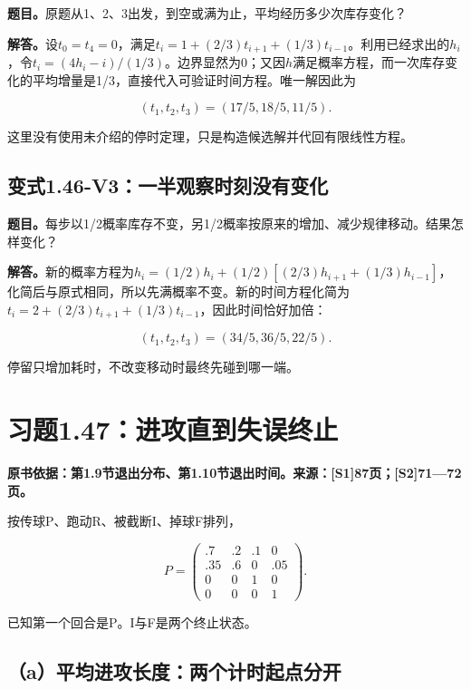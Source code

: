 \documentclass[
  11pt,
  a4paper,
  UTF8,
  fontset=fandol]{ctexart}
\begin{document}
\textbf{题目。}原题从1、2、3出发，到空或满为止，平均经历多少次库存变化？

\textbf{解答。}设\(t_0=t_4=0\)，满足\(t_i=1+(2/3)t_{i+1}+(1/3)t_{i-1}\)。利用已经求出的\(h_i\)，令\(t_i=(4h_i-i)/(1/3)\)。边界显然为0；又因\(h\)满足概率方程，而一次库存变化的平均增量是1/3，直接代入可验证时间方程。唯一解因此为

\[
\boxed{(t_1,t_2,t_3)=(17/5,18/5,11/5).}
\]

这里没有使用未介绍的停时定理，只是构造候选解并代回有限线性方程。

\subsection{变式1.46-V3：一半观察时刻没有变化}\label{ux53d8ux5f0f1.46-v3ux4e00ux534aux89c2ux5bdfux65f6ux523bux6ca1ux6709ux53d8ux5316}

\textbf{题目。}每步以1/2概率库存不变，另1/2概率按原来的增加、减少规律移动。结果怎样变化？

\textbf{解答。}新的概率方程为\(h_i=(1/2)h_i+(1/2)[(2/3)h_{i+1}+(1/3)h_{i-1}]\)，化简后与原式相同，所以先满概率不变。新的时间方程化简为\(t_i=2+(2/3)t_{i+1}+(1/3)t_{i-1}\)，因此时间恰好加倍：

\[
\boxed{(t_1,t_2,t_3)=(34/5,36/5,22/5).}
\]

停留只增加耗时，不改变移动时最终先碰到哪一端。

\section{习题1.47：进攻直到失误终止}\label{ux4e60ux98981.47ux8fdbux653bux76f4ux5230ux5931ux8befux7ec8ux6b62}

\textbf{原书依据：第1.9节退出分布、第1.10节退出时间。来源：{[}S1{]}87页；{[}S2{]}71---72页。}

按传球P、跑动R、被截断I、掉球F排列，

\[
P=\begin{pmatrix}
.7&.2&.1&0\\.35&.6&0&.05\\0&0&1&0\\0&0&0&1
\end{pmatrix}.
\]

已知第一个回合是P。I与F是两个终止状态。

\subsection{（a）平均进攻长度：两个计时起点分开}\label{aux5e73ux5747ux8fdbux653bux957fux5ea6ux4e24ux4e2aux8ba1ux65f6ux8d77ux70b9ux5206ux5f00}
\end{document}
